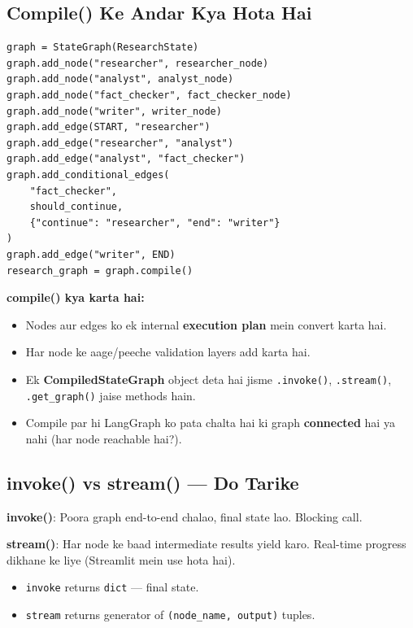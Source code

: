 \subsection{Compile() Ke Andar Kya Hota Hai}

\begin{codestorybox}
\begin{lstlisting}[style=pythonstyle]
graph = StateGraph(ResearchState)
graph.add_node("researcher", researcher_node)
graph.add_node("analyst", analyst_node)
graph.add_node("fact_checker", fact_checker_node)
graph.add_node("writer", writer_node)
graph.add_edge(START, "researcher")
graph.add_edge("researcher", "analyst")
graph.add_edge("analyst", "fact_checker")
graph.add_conditional_edges(
    "fact_checker",
    should_continue,
    {"continue": "researcher", "end": "writer"}
)
graph.add_edge("writer", END)
research_graph = graph.compile()
\end{lstlisting}

\textbf{compile() kya karta hai:}
\begin{itemize}
\item Nodes aur edges ko ek internal \textbf{execution plan} mein convert karta hai.
\item Har node ke aage/peeche validation layers add karta hai.
\item Ek \textbf{CompiledStateGraph} object deta hai jisme \texttt{.invoke()}, \texttt{.stream()}, \texttt{.get\_graph()} jaise methods hain.
\item Compile par hi LangGraph ko pata chalta hai ki graph \textbf{connected} hai ya nahi (har node reachable hai?).
\end{itemize}
\end{codestorybox}

\subsection{invoke() vs stream() --- Do Tarike}

\begin{notebox}
\textbf{invoke()}: Poora graph end-to-end chalao, final state lao. Blocking call.

\textbf{stream()}: Har node ke baad intermediate results yield karo. Real-time progress dikhane ke liye (Streamlit mein use hota hai).

\begin{itemize}
\item \texttt{invoke} returns \texttt{dict} --- final state.
\item \texttt{stream} returns generator of \texttt{(node\_name, output)} tuples.
\end{itemize}
\end{notebox}

